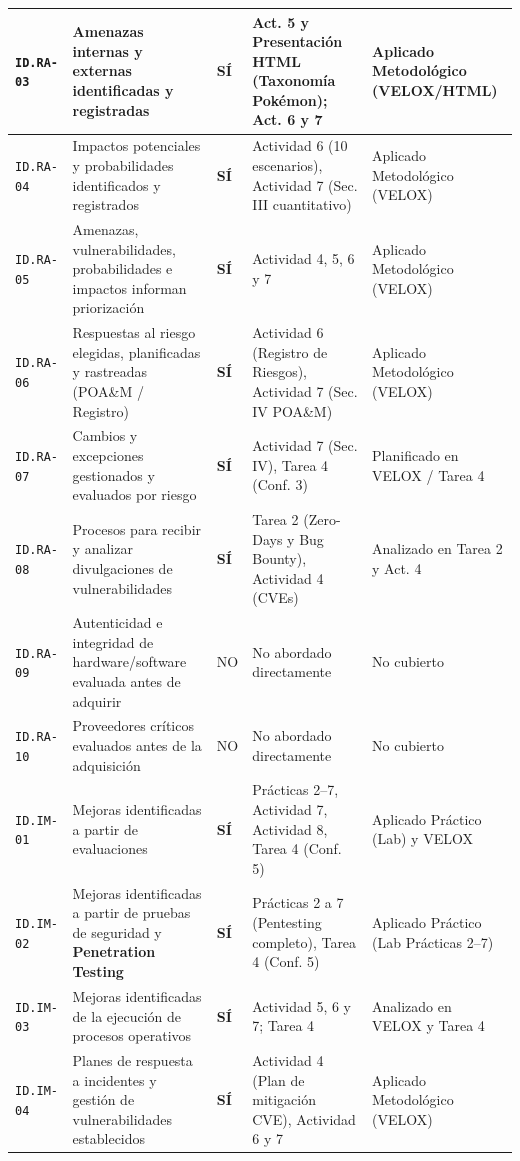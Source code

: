 \documentclass[letterpaper,11pt]{article}
\begin{document}
\begin{longtable}{|C{1.4cm}|L{5.4cm}|C{1.3cm}|L{4.3cm}|C{4.2cm}|}
\hline
\texttt{ID.RA-03} & Amenazas internas y externas identificadas y registradas & \textbf{SÍ} & Act. 5 y Presentación HTML (Taxonomía Pokémon); Act. 6 y 7 & Aplicado Metodológico (VELOX/HTML) \\
\hline
\texttt{ID.RA-04} & Impactos potenciales y probabilidades identificados y registrados & \textbf{SÍ} & Actividad 6 (10 escenarios), Actividad 7 (Sec. III cuantitativo) & Aplicado Metodológico (VELOX) \\
\hline
\texttt{ID.RA-05} & Amenazas, vulnerabilidades, probabilidades e impactos informan priorización & \textbf{SÍ} & Actividad 4, 5, 6 y 7 & Aplicado Metodológico (VELOX) \\
\hline
\texttt{ID.RA-06} & Respuestas al riesgo elegidas, planificadas y rastreadas (POA\&M / Registro) & \textbf{SÍ} & Actividad 6 (Registro de Riesgos), Actividad 7 (Sec. IV POA\&M) & Aplicado Metodológico (VELOX) \\
\hline
\texttt{ID.RA-07} & Cambios y excepciones gestionados y evaluados por riesgo & \textbf{SÍ} & Actividad 7 (Sec. IV), Tarea 4 (Conf. 3) & Planificado en VELOX / Tarea 4 \\
\hline
\texttt{ID.RA-08} & Procesos para recibir y analizar divulgaciones de vulnerabilidades & \textbf{SÍ} & Tarea 2 (Zero-Days y Bug Bounty), Actividad 4 (CVEs) & Analizado en Tarea 2 y Act. 4 \\
\hline
\texttt{ID.RA-09} & Autenticidad e integridad de hardware/software evaluada antes de adquirir & NO & No abordado directamente & No cubierto \\
\hline
\texttt{ID.RA-10} & Proveedores críticos evaluados antes de la adquisición & NO & No abordado directamente & No cubierto \\
\hline
\texttt{ID.IM-01} & Mejoras identificadas a partir de evaluaciones & \textbf{SÍ} & Prácticas 2--7, Actividad 7, Actividad 8, Tarea 4 (Conf. 5) & Aplicado Práctico (Lab) y VELOX \\
\hline
\texttt{ID.IM-02} & Mejoras identificadas a partir de pruebas de seguridad y \textbf{Penetration Testing} & \textbf{SÍ} & Prácticas 2 a 7 (Pentesting completo), Tarea 4 (Conf. 5) & Aplicado Práctico (Lab Prácticas 2--7) \\
\hline
\texttt{ID.IM-03} & Mejoras identificadas de la ejecución de procesos operativos & \textbf{SÍ} & Actividad 5, 6 y 7; Tarea 4 & Analizado en VELOX y Tarea 4 \\
\hline
\texttt{ID.IM-04} & Planes de respuesta a incidentes y gestión de vulnerabilidades establecidos & \textbf{SÍ} & Actividad 4 (Plan de mitigación CVE), Actividad 6 y 7 & Aplicado Metodológico (VELOX) \\
\hline


\end{longtable}
\end{document}
